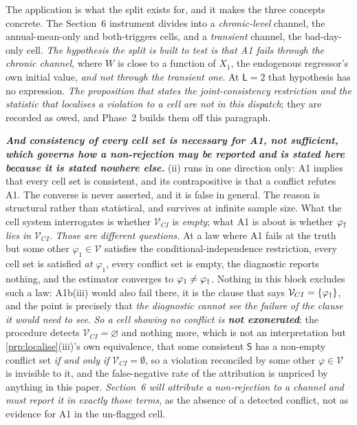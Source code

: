 The application is what the split exists for, and it makes the three concepts concrete. The
Section~6 instrument divides into a \emph{chronic-level} channel, the annual-mean-only and
both-triggers cells, and a \emph{transient} channel, the bad-day-only cell. \emph{The hypothesis the
split is built to test is that A1 fails through the chronic channel}, where $W$ is close to a function of
$X_1$, the endogenous regressor's own initial value, \emph{and not through the transient one}. At
$\mathsf L=2$ that hypothesis has no expression. \emph{The proposition that states the joint-consistency
restriction and the statistic that localises a violation to a cell are not in this dispatch}; they are
recorded as owed, and Phase~2 builds them off this paragraph.

\emph{\textbf{And consistency of every cell set is \textbf{necessary} for A1, not sufficient, which
governs how a non-rejection may be reported and is stated here because it is stated nowhere else.}}
\textup{(ii)} runs in one direction only: A1 implies that every cell set is
consistent, and its contrapositive is that a conflict refutes A1. The converse is never asserted,
and it is false in general. The reason is structural rather than statistical, and survives at infinite
sample size. What the cell system interrogates is whether $\mathcal V_{CI}$ is \emph{empty}; what A1 is
about is whether $\varphi_{\dagger}$ \emph{lies in} $\mathcal V_{CI}$. \emph{Those are different questions.} At a
law where A1 fails at the truth but some other $\varphi_1\in\mathcal V$ satisfies the
conditional-independence restriction, every cell set is satisfied \emph{at $\varphi_1$}, every conflict
set is empty, the diagnostic reports nothing, and the estimator converges to $\varphi_1\ne\varphi_{\dagger}$.
Nothing in this block excludes such a law: A1b(iii) would also fail there, it is the clause that says
$\mathcal V_{CI}=\{\varphi_{\dagger}\}$, and the point is precisely that \emph{the diagnostic cannot see the
failure of the clause it would need to see}.
\emph{So a cell showing no conflict is \textbf{not exonerated}}: the procedure detects
$\mathcal V_{CI}=\varnothing$ and nothing more, which is not an interpretation but
\cref{prp:localise}\textup{(iii)}'s own equivalence, that some consistent $\mathsf S$ has a non-empty
conflict set \emph{if and only if} $\mathcal V_{CI}=\emptyset$, so a violation reconciled by some other
$\varphi\in\mathcal V$ is invisible to it, and the false-negative rate of the attribution is
unpriced by anything in this paper. \emph{Section~6 will attribute a non-rejection to a channel and must report it in exactly those
terms}, as the absence of a detected conflict, not as evidence for A1 in the un-flagged cell.
